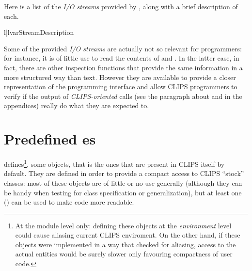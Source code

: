 Here is a list of the \emph{I/O streams} provided by \pyclips{}, along
with a brief description of each.

\begin{tableii}{l|l}{var}{Stream}{Description}
\end{tableii}

Some of the provided \emph{I/O streams} are actually not so relevant for
\pyclips{} programmers: for instance, it is of little use to read the
contents of  and . In the latter
case, in fact, there are other inspection functions that provide the
same information in a more structured way than text. However they are
available to provide a closer representation of the programming interface
and allow CLIPS programmers to verify if the output of \emph{CLIPS-oriented}
calls (see the paragraph about  and 
in the appendices) really do what they are expected to.



\section{Predefined es\label{pyclips-cl-stockclasses}}

\pyclips{} defines\footnote{At the module level only: defining these
objects at the \emph{environment} level could cause aliasing current
CLIPS enviroment. On the other hand, if these objects were implemented in
a way that checked for aliasing, access to the actual entities would be
surely slower only favouring compactness of user code.}, some 
objects, that is the ones that are present in CLIPS itself by default. They
are defined in order to provide a compact access to CLIPS ``stock'' classes:
most of these objects are of little or no use generally (although they
can be handy when testing for class specification or generalization), but
at least one () can be used to make code more readable.

